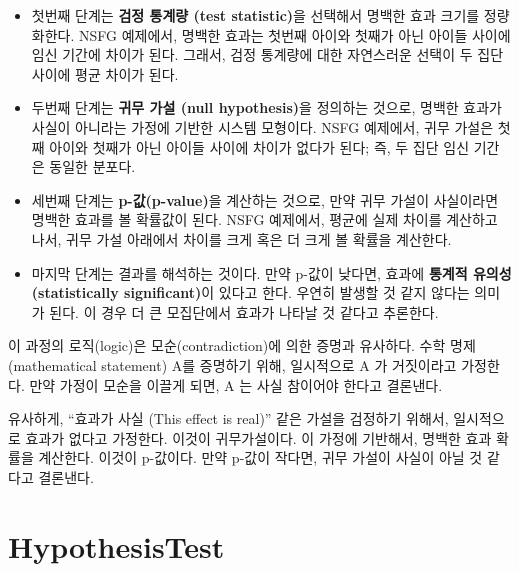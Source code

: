 \begin{itemize}

\item 첫번째 단계는 {\bf 검정 통계량 (test statistic)}을 선택해서 
명백한 효과 크기를 정량화한다. NSFG 예제에서, 명백한 효과는 첫번째 아이와 첫째가 아닌 아이들 사이에 임신 기간에 차이가 된다. 그래서, 검정 통계량에 대한 자연스러운 선택이
두 집단 사이에 평균 차이가 된다.

\item 두번째 단계는 {\bf 귀무 가설 (null hypothesis)}을 정의하는 것으로,
명백한 효과가 사실이 아니라는 가정에 기반한 시스템 모형이다.
NSFG 예제에서, 귀무 가설은 첫째 아이와 첫째가 아닌 아이들 사이에 차이가 없다가 된다;
즉, 두 집단 임신 기간은 동일한 분포다. 

\item 세번째 단계는 {\bf p-값(p-value)}을 계산하는 것으로, 만약 귀무 가설이 사실이라면 명백한 효과를 볼 확률값이 된다. NSFG 예제에서, 평균에 실제 차이를 계산하고 나서, 귀무 가설 아래에서 차이를 크게 혹은 더 크게 볼 확률을 계산한다.

\item 마지막 단계는 결과를 해석하는 것이다. 만약 p-값이 낮다면, 효과에 
{\bf 통계적 유의성 (statistically significant)}이 있다고 한다.
우연히 발생할 것 같지 않다는 의미가 된다. 이 경우 더 큰 모집단에서 효과가 나타날 것 같다고 추론한다. 

\end{itemize}

이 과정의 로직(logic)은 모순(contradiction)에 의한 증명과 유사하다. 
수학 명제(mathematical statement) A를 증명하기 위해, 일시적으로 A 가 거짓이라고 가정한다.
만약 가정이 모순을 이끌게 되면, A 는 사실 참이어야 한다고 결론낸다.


유사하게, ``효과가 사실 (This effect is real)'' 같은 가설을 검정하기 위해서,
일시적으로 효과가 없다고 가정한다. 이것이 귀무가설이다.
이 가정에 기반해서, 명백한 효과 확률을 계산한다. 이것이 p-값이다.
만약 p-값이 작다면, 귀무 가설이 사실이 아닐 것 같다고 결론낸다.



\section{HypothesisTest}
\label{hypotest}

